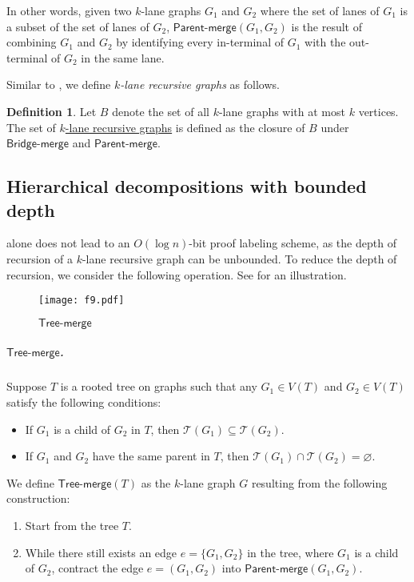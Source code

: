 \documentclass[11pt]{article}
\theoremstyle{definition}
\newtheorem{definition}[lemma]{Definition}
\theoremstyle{remark}
\renewcommand{\emptyset}{\varnothing}
\newcommand{\tmerge}{\mathsf{Tree}\text{-}\mathsf{merge}}
\newcommand{\pmerge}{\mathsf{Parent}\text{-}\mathsf{merge}}
\newcommand{\bmerge}{\mathsf{Bridge}\text{-}\mathsf{merge}}
\begin{document}
In other words, given two $k$-lane graphs $G_1$ and $G_2$ where the set of lanes of $G_1$ is a subset of the set of lanes of $G_2$, $\pmerge(G_1, G_2)$ is the result of combining $G_1$ and $G_2$ by identifying every in-terminal of $G_1$ with the out-terminal of $G_2$ in the same lane.

Similar to , we define \emph{$k$-lane recursive graphs} as follows.

\begin{definition}
    \label{terminal-recursive-gluing2}
 Let $B$ denote the set of all $k$-lane graphs with at most $k$ vertices. The set of \ul{$k$-lane recursive graphs} is defined as the closure of $B$ under $\bmerge$ and $\pmerge$.
\end{definition}



\subsection{Hierarchical decompositions with bounded depth}\label{sect:recursive_def}

 alone does not lead to an $O(\log n)$-bit proof labeling scheme, as the depth of recursion of a $k$-lane recursive graph can be unbounded. To reduce the depth of recursion, we consider the following operation. See  for an illustration.

\begin{figure}[ht!]
    \centering
    \texttt{[image: f9.pdf]}
    \caption{$\tmerge$}
    \label{fig:f9}
\end{figure}

\subparagraph{$\tmerge$.} Suppose $T$ is a rooted tree on graphs such that any $G_1 \in V(T)$ and $G_2 \in V(T)$ satisfy the following conditions:
\begin{itemize}
    \item If $G_1$ is a child of $G_2$ in $T$, then $\mathcal{T}(G_1) \subseteq \mathcal{T}(G_2)$.
    \item If $G_1$ and $G_2$ have the same parent in $T$, then $\mathcal{T}(G_1) \cap \mathcal{T}(G_2) = \emptyset$.  
\end{itemize}
We define $\tmerge(T)$ as the $k$-lane graph $G$ resulting from the following construction:
\begin{enumerate}
    \item Start from the tree $T$.
    \item While there still exists an edge $e=\{G_1, G_2\}$ in the tree, where $G_1$ is a child of $G_2$, contract the edge $e=(G_1, G_2)$ into $\pmerge(G_1,G_2)$.
\end{enumerate}
\end{document}
